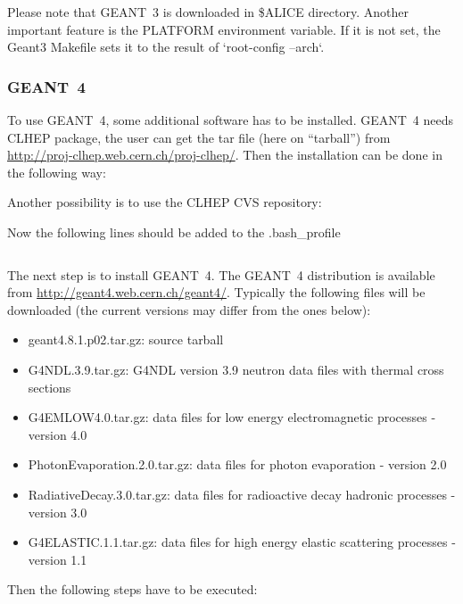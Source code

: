 \documentclass[12pt,a4paper,twoside]{article}
\begin{document}
Please note  that GEANT~3 is downloaded in  \$ALICE directory. Another
important feature is  the PLATFORM environment variable. If  it is not
set,  the  Geant3 Makefile  sets  it  to  the result  of  `root-config
--arch`.

\subsubsection{GEANT~4}
To use GEANT~4\cite{Geant4}, some additional software has to
be installed. GEANT~4 needs CLHEP\cite{CLHEP} package, the user can
get the tar file (here on ``tarball'') from
\url{http://proj-clhep.web.cern.ch/proj-clhep/}.
 Then the installation can be done in the following way:




Another possibility is to use the CLHEP CVS repository:



Now the following lines should be added to the .bash\_profile

\begin{lstlisting}[language=sh]
  % export CLHEP_BASE_DIR=$ALICE/CLHEP
\end{lstlisting} 

The next step is to install GEANT~4. The GEANT~4 distribution is available from
\url{http://geant4.web.cern.ch/geant4/}. Typically the following files
will be downloaded (the current versions may differ from the ones below): 
\begin{itemize}
\item geant4.8.1.p02.tar.gz: source tarball
\item G4NDL.3.9.tar.gz: G4NDL version 3.9 neutron data files with thermal cross sections
\item G4EMLOW4.0.tar.gz: data files for low energy electromagnetic processes - version 4.0
\item PhotonEvaporation.2.0.tar.gz: data files for photon evaporation - version 2.0
\item RadiativeDecay.3.0.tar.gz: data files for radioactive decay hadronic processes - version 3.0
\item G4ELASTIC.1.1.tar.gz: data files for high energy elastic scattering processes - version 1.1
\end{itemize}

Then the following steps have to be executed:
\end{document}
